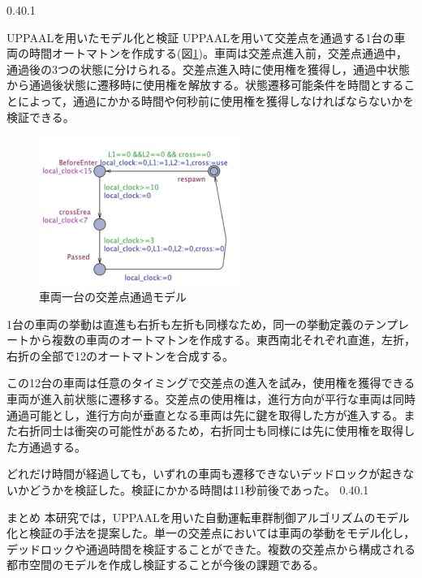 \documentclass[twocolumn,10pt]{jsarticle}
\makeatletter
\renewcommand{\section}{%
   \@startsection{section}{1}{\z@}%
   {0.4\Cvs}{0.1\Cvs}%
   {\normalfont\large\headfont\raggedright}}
\makeatother
\begin{document}
\section{UPPAALを用いたモデル化と検証}
UPPAALを用いて交差点を通過する1台の車両の時間オートマトンを作成する(図\ref{Simple})。車両は交差点進入前，交差点通過中，通過後の3つの状態に分けられる。交差点進入時に使用権を獲得し，通過中状態から通過後状態に遷移時に使用権を解放する。状態遷移可能条件を時間とすることによって，通過にかかる時間や何秒前に使用権を獲得しなければならないかを検証できる。
\begin{figure}[htbp]
\centering
\includegraphics[width=65mm]{Simple.png}
\caption{車両一台の交差点通過モデル}
\label{Simple}
\end{figure}

1台の車両の挙動は直進も右折も左折も同様なため，同一の挙動定義のテンプレートから複数の車両のオートマトンを作成する。東西南北それぞれ直進，左折，右折の全部で12のオートマトンを合成する。

この12台の車両は任意のタイミングで交差点の進入を試み，使用権を獲得できる車両が進入前状態に遷移する。交差点の使用権は，進行方向が平行な車両は同時通過可能とし，進行方向が垂直となる車両は先に鍵を取得した方が進入する。また右折同士は衝突の可能性があるため，右折同士も同様には先に使用権を取得した方通過する。

どれだけ時間が経過しても，いずれの車両も遷移できないデッドロックが起きないかどうかを検証した。検証にかかる時間は11秒前後であった。
\section{まとめ}
本研究では，UPPAALを用いた自動運転車群制御アルゴリズムのモデル化と検証の手法を提案した。単一の交差点においては車両の挙動をモデル化し，デッドロックや通過時間を検証することができた。複数の交差点から構成される都市空間のモデルを作成し検証することが今後の課題である。
\begin{thebibliography}{1}
\end{thebibliography}
%
\end{document}
